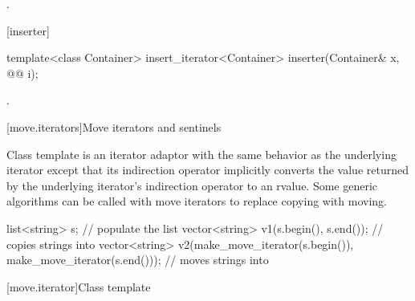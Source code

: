 \begin{itemdescr}
\pnum
\returns
{}.
\end{itemdescr}

[inserter]{}

%
\begin{itemdecl}
template<class Container>
  insert_iterator<Container> inserter(Container& x, @@ i);
\end{itemdecl}

\begin{itemdescr}
\pnum
\returns
{}.
\end{itemdescr}








[move.iterators]{Move iterators and sentinels}


\pnum
Class template  is an iterator adaptor
with the same behavior as the underlying iterator except that its
indirection operator implicitly converts the value returned by the
underlying iterator's indirection operator to an rvalue.
Some generic algorithms can be called with move iterators to replace
copying with moving.

\pnum
\begin{example}

\begin{codeblock}
list<string> s;
// populate the list 
vector<string> v1(s.begin(), s.end());          // copies strings into 
vector<string> v2(make_move_iterator(s.begin()),
                  make_move_iterator(s.end())); // moves strings into 
\end{codeblock}

\end{example}

[move.iterator]{Class template }

